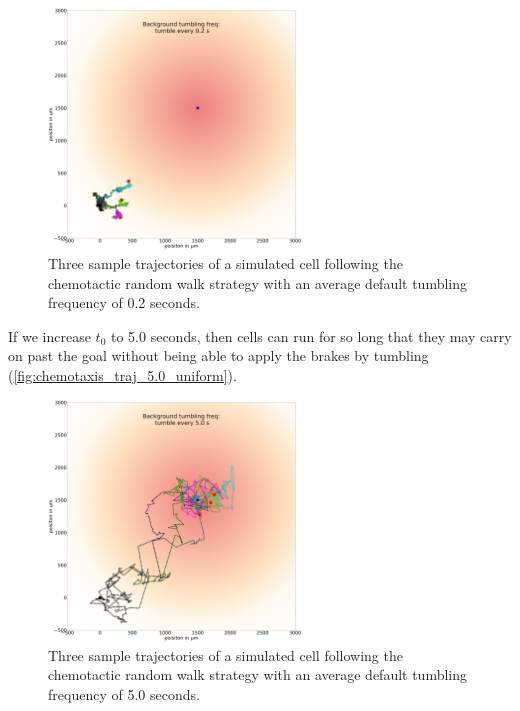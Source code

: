 \begin{figure}[h]
\centering
\mySfFamily
\includegraphics[width = 0.6\textwidth]{../images/chemotaxis_traj_0.2_uniform.png}
\caption{Three sample trajectories of a simulated cell following the chemotactic random walk strategy with an average default tumbling frequency of 0.2 seconds.}
\label{fig:chemotaxis_traj_0.2_uniform}
\end{figure}

If we increase $t_0$ to 5.0 seconds, then cells can run for so long that they may carry on past the goal without being able to apply the brakes by tumbling (\autoref{fig:chemotaxis_traj_5.0_uniform}).

\begin{figure}[h]
\centering
\mySfFamily
\includegraphics[width = 0.6\textwidth]{../images/chemotaxis_traj_5.0_uniform.png}
\caption{Three sample trajectories of a simulated cell following the chemotactic random walk strategy with an average default tumbling frequency of 5.0 seconds.}
\label{fig:chemotaxis_traj_5.0_uniform}
\end{figure}


